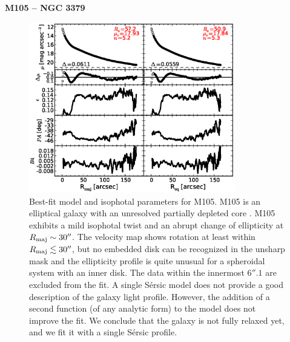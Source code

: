 \documentclass[preprint2]{emulateapj}
\newcommand{\fitfigurewidth}{0.8\textwidth}
\begin{document}
  \clearpage\newpage\noindent
  {\bf M105 -- NGC 3379 \\}

  \begin{figure}[h]
  \begin{center}
  \includegraphics[width=\fitfigurewidth]{images/m105_1Dfit.eps}
  \caption{Best-fit model and isophotal parameters for M105.
  M105 is an elliptical galaxy with an unresolved partially depleted core \citep{rusli2013}. %
  M105 exhibits a mild isophotal twist and an abrupt change of ellipticity at $R_{\rm maj} \sim 30''$.
  The velocity map shows rotation at least within $R_{\rm maj} \lesssim 30''$, 
  but no embedded disk can be recognized in the unsharp mask 
  and the ellipticity profile is quite unusual for a spheroidal system with an inner disk.
  The data within the innermost $6''.1$ are excluded from the fit.
  A single S\'ersic model does not provide a good description of the galaxy light profile.
  However, the addition of a second function (of any analytic form) to the model does not improve the fit.
  We conclude that the galaxy is not fully relaxed yet, and we fit it with a single S\'ersic profile. 
  }
  \end{center}
  \end{figure}
\end{document}
